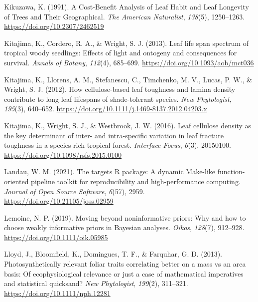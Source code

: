 \documentclass[
  12pt,
  letterpaper,
  DIV=11,
  numbers=noendperiod]{scrartcl}
\newlength{\cslhangindent}
\newlength{\cslentryspacingunit} %
\newenvironment{CSLReferences}[2] %
 {%
  \setlength{\parindent}{0pt}
  \ifodd #1
  \let\oldpar\par
  \def\par{\hangindent=\cslhangindent\oldpar}
  \fi
  \setlength{\parskip}{#2\cslentryspacingunit}
 }%
 {}
\begin{document}
\begin{CSLReferences}{1}{0}
\leavevmode{}%
Kikuzawa, K. (1991). A {Cost-Benefit Analysis} of {Leaf Habit} and {Leaf
Longevity} of {Trees} and {Their Geographical}. \emph{The American
Naturalist}, \emph{138}(5), 1250--1263.
\url{https://doi.org/10.2307/2462519}

\leavevmode{}%
Kitajima, K., Cordero, R. A., \& Wright, S. J. (2013). Leaf life span
spectrum of tropical woody seedlings: {Effects} of light and ontogeny
and consequences for survival. \emph{Annals of Botany}, \emph{112}(4),
685--699. \url{https://doi.org/10.1093/aob/mct036}

\leavevmode{}%
Kitajima, K., Llorens, A. M., Stefanescu, C., Timchenko, M. V., Lucas,
P. W., \& Wright, S. J. (2012). How cellulose-based leaf toughness and
lamina density contribute to long leaf lifespans of shade-tolerant
species. \emph{New Phytologist}, \emph{195}(3), 640--652.
\url{https://doi.org/10.1111/j.1469-8137.2012.04203.x}

\leavevmode{}%
Kitajima, K., Wright, S. J., \& Westbrook, J. W. (2016). Leaf cellulose
density as the key determinant of inter- and intra-specific variation in
leaf fracture toughness in a species-rich tropical forest.
\emph{Interface Focus}, \emph{6}(3), 20150100.
\url{https://doi.org/10.1098/rsfs.2015.0100}

\leavevmode{}%
Landau, W. M. (2021). The targets {R} package: A dynamic {Make-like}
function-oriented pipeline toolkit for reproducibility and
high-performance computing. \emph{Journal of Open Source Software},
\emph{6}(57), 2959. \url{https://doi.org/10.21105/joss.02959}

\leavevmode{}%
Lemoine, N. P. (2019). Moving beyond noninformative priors: Why and how
to choose weakly informative priors in {Bayesian} analyses.
\emph{Oikos}, \emph{128}(7), 912--928.
\url{https://doi.org/10.1111/oik.05985}

\leavevmode{}%
Lloyd, J., Bloomfield, K., Domingues, T. F., \& Farquhar, G. D. (2013).
Photosynthetically relevant foliar traits correlating better on a mass
vs an area basis: {Of} ecophysiological relevance or just a case of
mathematical imperatives and statistical quicksand? \emph{New
Phytologist}, \emph{199}(2), 311--321.
\url{https://doi.org/10.1111/nph.12281}


\end{CSLReferences}
\end{document}
